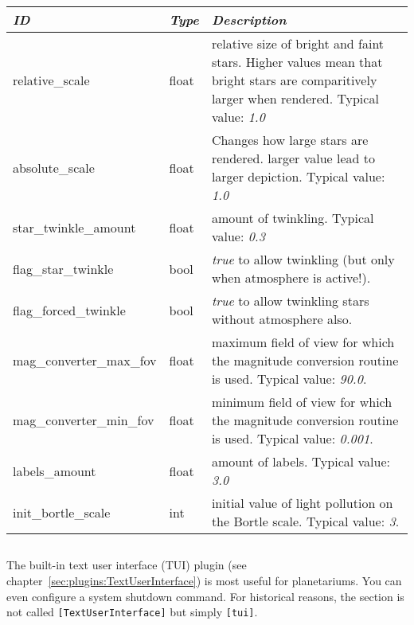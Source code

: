 \begin{longtabu} to \textwidth {l|l|X}\toprule
\emph{ID}                & \emph{Type} & \emph{Description}\\\midrule
relative\_scale          & float       & relative size of bright and faint stars. Higher values mean that bright stars are comparitively larger when rendered. Typical value: \emph{1.0}\\\midrule
absolute\_scale          & float       & Changes how large stars are rendered. larger value lead to larger depiction. Typical value: \emph{1.0}\\\midrule
star\_twinkle\_amount    & float       & amount of twinkling. Typical value: \emph{0.3}\\\midrule
flag\_star\_twinkle      & bool        & \emph{true} to allow twinkling (but only when atmosphere is active!).\\\midrule
flag\_forced\_twinkle    & bool        & \emph{true} to allow twinkling stars without atmosphere also.\\\midrule
mag\_converter\_max\_fov & float       & maximum field of view for which the magnitude conversion routine is used. Typical value: \emph{90.0}.\\\midrule
mag\_converter\_min\_fov & float       & minimum field of view for which the magnitude conversion routine is used. Typical value: \emph{0.001}.\\\midrule
labels\_amount           & float       & amount of labels. Typical value: \emph{3.0}\\\midrule
init\_bortle\_scale      & int         & initial value of light pollution on the Bortle scale. Typical value: \emph{3}.\\\bottomrule
\end{longtabu}

\subsection{}\label{sec:config.ini:tui}

The built-in text user interface (TUI) plugin (see chapter~\ref{sec:plugins:TextUserInterface}) is most useful for planetariums. You can even configure a system shutdown command. 
For historical reasons, the section is not called \texttt{[TextUserInterface]} but simply \texttt{[tui]}.

